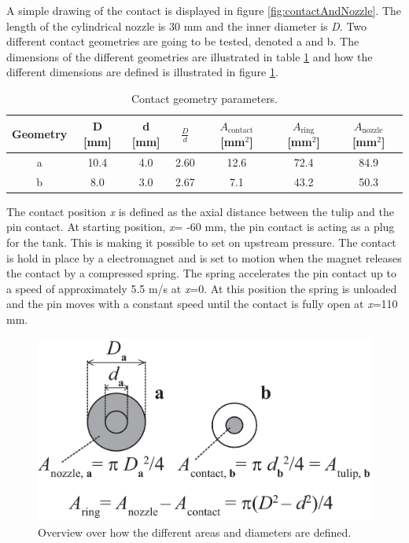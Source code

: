 \documentclass[10pt,a4paper,twoside]{article}
\begin{document}
A simple drawing of the contact is displayed in figure \ref{fig:contactAndNozzle}. The length of the cylindrical nozzle is 30 mm and the inner diameter is \textit{D}. Two different contact geometries are going to be tested, denoted a and b. The dimensions of the different geometries are illustrated in table \ref{tab:contGeoPara} and how the different dimensions are defined is illustrated in figure \ref{fig:AreacontactAndNozzle}.

\begin{table}[H]
\center
\caption{Contact geometry parameters.}
 \begin{tabular}{|c|c|c|c|c|c|c|}
\hline 
Geometry & D [mm] & d [mm] & $\frac{D}{d}$ & $A_\mathrm{{contact}}$ [mm$^2$] & $A_\mathrm{{ring}}$ [mm$^2$] & $A_\mathrm{{nozzle}}$ [mm$^2$] \\ 
\hline 
a & 10.4 & 4.0 & 2.60 & 12.6 & 72.4 & 84.9 \\ 
\hline 
b & 8.0 & 3.0 & 2.67 & 7.1 & 43.2 & 50.3 \\ 
\hline 
\end{tabular} 
\label{tab:contGeoPara}
\end{table}

The contact position \textit{x} is defined as the axial distance between the tulip and the pin contact. At starting position, \textit{x}= -60 mm, the pin contact is acting as a plug for the tank. This is making it possible to set on upstream pressure. The contact is hold in place by a electromagnet and is set to motion when the magnet releases the contact by a compressed spring. The spring accelerates the pin contact up to a speed of approximately 5.5 m/s at \textit{x}=0. At this position the spring is unloaded  and the pin moves with a constant speed until the contact is fully open at \textit{x}=110 mm.

\begin{figure} [H]
\centering
\includegraphics[scale=0.2]{Bilder/Theory/kontaktoversiktAnders.png}
\caption{Overview over how the different areas and diameters are defined.} \label{fig:AreacontactAndNozzle}
\end{figure}
\end{document}
